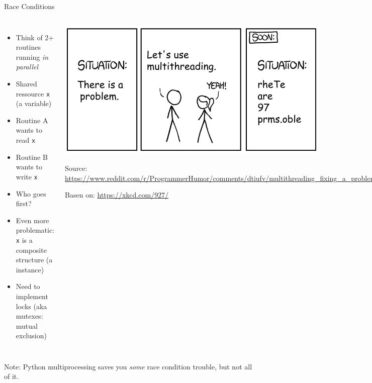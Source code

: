 \begin{frame}[fragile]{Race Conditions}
%
\begin{columns}[T]
\begin{itemize}
\item Think of 2+ routines running \emph{in parallel}
\item Shared ressource \texttt{x} (\eg a variable)
\item Routine A wants to read \texttt{x}
\item Routine B wants to write \texttt{x}
\item Who goes first?
\item Even more problematic: \texttt{x} is a composite structure (\eg a  instance)
\item[\Thus] Need to implement locks (aka mutexes: mutual exclusion)
\end{itemize}
%
\begin{center}
	\includegraphics[width=\linewidth]{./gfx/reddit-xkcd-multithreading}
	{\tiny
	 Source: \url{https://www.reddit.com/r/ProgrammerHumor/comments/dtiufv/multithreading_fixing_a_problem/}
	 
	 Basen on: \url{https://xkcd.com/927/}
	}
\end{center}
\end{columns}

\vspace{6pt}
Note: Python multiprocessing saves you \emph{some} race condition trouble, but not all of it.
%
\end{frame}


